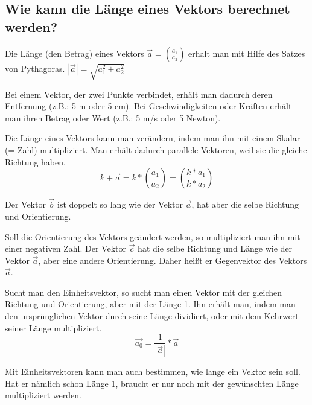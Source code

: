 \newpage
\subsection{Wie kann die Länge eines Vektors berechnet werden?}

\hfill \break
Die Länge (den Betrag) eines Vektors $\vec{a} = \binom{a_1}{a_2} $ erhalt man mit Hilfe des Satzes von Pythagoras. $|\vec{a}| = \sqrt{a_1^2+a_2^2}$

\hfill \break
Bei einem Vektor, der zwei Punkte verbindet, erhält man dadurch deren Entfernung (z.B.: 5 m oder 5 cm).
Bei Geschwindigkeiten oder Kräften erhält man ihren Betrag oder Wert (z.B.: 5 m/s oder 5 Newton).

\hfill \break
Die Länge eines Vektors kann man verändern, indem man ihn mit einem Skalar (= Zahl) multipliziert.
Man erhält dadurch parallele Vektoren, weil sie die gleiche Richtung haben.
$$k+\vec{a}=k*\binom{a_1}{a_2} = \binom{k*a_1}{k*a_2}$$

\hfill \break
Der Vektor $\vec{b}$ ist doppelt so lang wie der Vektor $\vec{a}$, hat aber die selbe Richtung und Orientierung.

\hfill \break
Soll die Orientierung des Vektors geändert werden, so multipliziert man ihn mit einer negativen Zahl.
Der Vektor $\vec{c}$ hat die selbe Richtung und Länge wie der Vektor $\vec{a}$, aber eine andere Orientierung.
Daher heißt er Gegenvektor des Vektors $\vec{a}$.

\hfill \break
Sucht man den Einheitsvektor, so sucht man einen Vektor mit der gleichen Richtung und Orientierung, aber mit der Länge 1.
Ihn erhält man, indem man den ursprünglichen Vektor durch seine Länge dividiert, oder mit dem Kehrwert seiner Länge multipliziert.
$$\vec{a_0}  = \frac{1}{|\vec{a}|}*\vec{a}$$

\hfill \break
Mit Einheitsvektoren kann man auch bestimmen, wie lange ein Vektor sein soll.
Hat er nämlich schon Länge 1, braucht er nur noch mit der gewünschten Länge multipliziert werden.